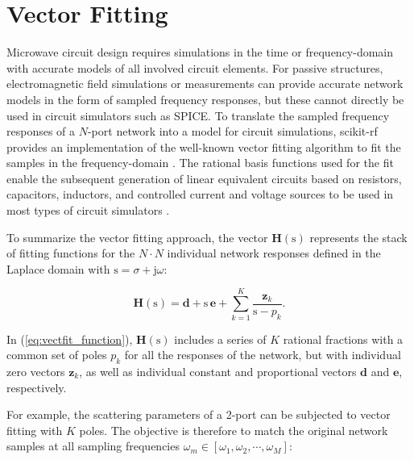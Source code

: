 \documentclass[10pt, letterpaper]{scrartcl}
\newcommand{\skrf}{{s}cikit-rf\xspace}
\begin{document}
\section{Vector Fitting}
Microwave circuit design requires simulations in the time or frequency-domain with accurate models of all involved circuit elements. For passive structures, electromagnetic field simulations or measurements can provide accurate network models in the form of sampled frequency responses, but these cannot directly be used in circuit simulators such as SPICE. To translate the sampled frequency responses of a $N$-port network into a model for circuit simulations, \skrf{} provides an implementation of the well-known vector fitting algorithm to fit the samples in the frequency-domain \cite{vectfit}. The rational basis functions used for the fit enable the subsequent generation of linear equivalent circuits based on resistors, capacitors, inductors, and controlled current and voltage sources to be used in most types of circuit simulators \cite{vectfit_spice}. 

To summarize the vector fitting approach, the vector $\mathbf{H}(\mathrm{s})$ represents the stack of fitting functions for the $N \cdot N$ individual network responses defined in the Laplace domain with $\mathrm{s} = \sigma + \mathrm{j} \omega$:

\begin{equation}
\mathbf{H}(\mathrm{s}) = \mathbf{d} + \mathrm{s} \, \mathbf{e} + \sum _{k=1} ^{K} \frac{\mathbf{z}_k}{\mathrm{s} - p_k}.
\label{eq:vectfit_function}
\end{equation}

In (\ref{eq:vectfit_function}), $\mathbf{H}(\mathrm{s})$ includes a series of $K$ rational fractions with a common set of poles $p_k$ for all the responses of the network, but with individual zero vectors $\mathbf{z}_{k}$, as well as individual constant and proportional vectors $\mathbf{d}$ and $\mathbf{e}$, respectively.

For example, the scattering parameters of a 2-port can be subjected to vector fitting with $K$ poles. The objective is therefore to match the original network samples at all sampling frequencies $\omega_m \in [\omega_1, \omega_2, \cdots, \omega_M]$:
\end{document}
